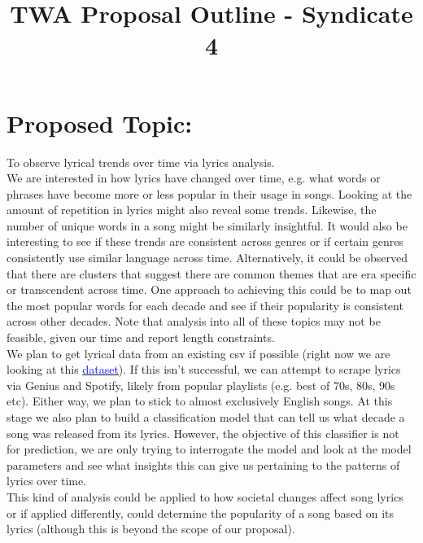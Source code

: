 \documentclass[12pt]{article}
\title{TWA Proposal Outline  - Syndicate 4}
\begin{document}
\maketitle
{\setlength{\parindent}{0cm}

\section*{Proposed Topic:}
To observe lyrical trends over time via lyrics analysis.\\

We are interested in how lyrics have changed over time, e.g. what words or phrases have become more or less popular in their usage in songs. Looking at the amount of repetition in lyrics might also reveal some trends. Likewise, the number of unique words in a song might be similarly insightful. It would also be interesting to see if these trends are consistent across genres or if certain genres consistently use similar language across time. Alternatively, it could be observed that there are clusters that suggest there are common themes that are era specific or transcendent across time. One approach to achieving this could be to map out the most popular words for each decade and see if their popularity is consistent across other decades. Note that analysis into all of these topics may not be feasible, given our time and report length constraints.\\

We plan to get lyrical data from an existing csv if possible (right now we are looking at this \href{https://www.kaggle.com/terminate9298/songs-lyrics}{\underline{\textcolor{blue}{dataset}}}). If this isn’t successful, we can attempt to scrape lyrics via Genius and Spotify, likely from popular playlists (e.g. best of 70s, 80s, 90s etc). Either way, we plan to stick to almost exclusively English songs. At this stage we also plan to build a classification model that can tell us what decade a song was released from its lyrics. However, the objective of this classifier is not for prediction, we are only trying to interrogate the model and look at the model parameters and see what insights this can give us pertaining to the patterns of lyrics over time.\\

This kind of analysis could be applied to how societal changes affect song lyrics or if applied differently, could determine the popularity of a song based on its lyrics (although this is beyond the scope of our proposal).


}
\end{document}
